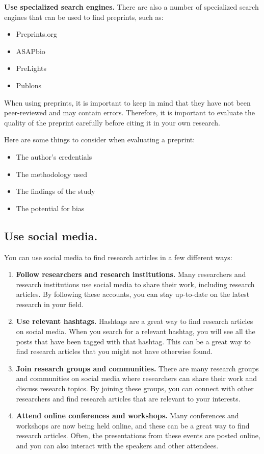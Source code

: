 \documentclass[
  b5paper]{book}
\begin{document}
\textbf{Use specialized search engines.} There are also a number of specialized search engines that can be used to find preprints, such as:

\begin{itemize}
\item
  Preprints.org
\item
  ASAPbio
\item
  PreLights
\item
  Publons
\end{itemize}

When using preprints, it is important to keep in mind that they have not been peer-reviewed and may contain errors. Therefore, it is important to evaluate the quality of the preprint carefully before citing it in your own research.

Here are some things to consider when evaluating a preprint:

\begin{itemize}
\item
  The author's credentials
\item
  The methodology used
\item
  The findings of the study
\item
  The potential for bias
\end{itemize}

\hypertarget{use-social-media.}{%
\subsection*{Use social media.}\label{use-social-media.}}

You can use social media to find research articles in a few different ways:

\begin{enumerate}
\def\labelenumi{\arabic{enumi}.}
\item
  \textbf{Follow researchers and research institutions.} Many researchers and research institutions use social media to share their work, including research articles. By following these accounts, you can stay up-to-date on the latest research in your field.
\item
  \textbf{Use relevant hashtags.} Hashtags are a great way to find research articles on social media. When you search for a relevant hashtag, you will see all the posts that have been tagged with that hashtag. This can be a great way to find research articles that you might not have otherwise found.
\item
  \textbf{Join research groups and communities.} There are many research groups and communities on social media where researchers can share their work and discuss research topics. By joining these groups, you can connect with other researchers and find research articles that are relevant to your interests.
\item
  \textbf{Attend online conferences and workshops.} Many conferences and workshops are now being held online, and these can be a great way to find research articles. Often, the presentations from these events are posted online, and you can also interact with the speakers and other attendees.
\end{enumerate}
\end{document}
